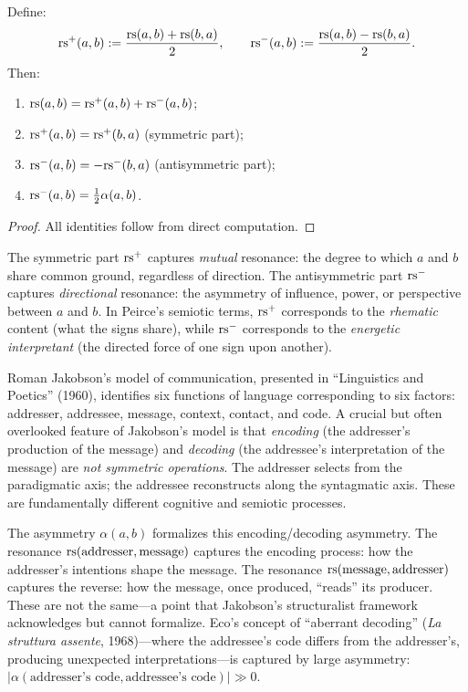\begin{theorem}\label{thm:rs-decomposition}
Define:
\[
    \mathrm{rs}^+(a, b) := \frac{\mathrm{rs}(a,b) + \mathrm{rs}(b,a)}{2}, \qquad
    \mathrm{rs}^-(a, b) := \frac{\mathrm{rs}(a,b) - \mathrm{rs}(b,a)}{2}.
\]
Then:
\begin{enumerate}
    \item $\mathrm{rs}(a,b) = \mathrm{rs}^+(a,b) + \mathrm{rs}^-(a,b)$;
    \item $\mathrm{rs}^+(a,b) = \mathrm{rs}^+(b,a)$ (symmetric part);
    \item $\mathrm{rs}^-(a,b) = -\mathrm{rs}^-(b,a)$ (antisymmetric part);
    \item $\mathrm{rs}^-(a,b) = \frac{1}{2}\alpha(a,b)$.
\end{enumerate}
\end{theorem}
\begin{proof}
All identities follow from direct computation.
\end{proof}

\begin{interpretation}
The symmetric part $\mathrm{rs}^+$ captures \emph{mutual} resonance: the degree to
which $a$ and $b$ share common ground, regardless of direction. The
antisymmetric part $\mathrm{rs}^-$ captures \emph{directional} resonance: the
asymmetry of influence, power, or perspective between $a$ and $b$. In
Peirce's semiotic terms, $\mathrm{rs}^+$ corresponds to the \emph{rhematic}
content (what the signs share), while $\mathrm{rs}^-$ corresponds to the
\emph{energetic interpretant} (the directed force of one sign upon
another).
\end{interpretation}

\begin{interpretation}\label{interp:ch4:jakobson_communication}
Roman Jakobson's model of communication, presented in ``Linguistics and
Poetics'' (1960), identifies six functions of language corresponding to six
factors: addresser, addressee, message, context, contact, and code. A
crucial but often overlooked feature of Jakobson's model is that
\emph{encoding} (the addresser's production of the message) and
\emph{decoding} (the addressee's interpretation of the message) are
\emph{not symmetric operations}. The addresser selects from the paradigmatic
axis; the addressee reconstructs along the syntagmatic axis. These are
fundamentally different cognitive and semiotic processes.

The asymmetry $\alpha(a, b)$ formalizes this encoding/decoding asymmetry.
The resonance $\mathrm{rs}(\text{addresser}, \text{message})$ captures the
encoding process: how the addresser's intentions shape the message. The
resonance $\mathrm{rs}(\text{message}, \text{addresser})$ captures the reverse:
how the message, once produced, ``reads'' its producer. These are not
the same---a point that Jakobson's structuralist framework acknowledges
but cannot formalize. Eco's concept of ``aberrant decoding'' (\emph{La
struttura assente}, 1968)---where the addressee's code differs from the
addresser's, producing unexpected interpretations---is captured by large
asymmetry: $|\alpha(\text{addresser's code}, \text{addressee's code})|
\gg 0$.
\end{interpretation}

